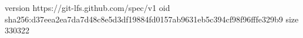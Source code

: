 version https://git-lfs.github.com/spec/v1
oid sha256:d37eea2ea7da7d48c8e5d3df19884fd0157ab9631eb5c394cf98f96fffe329b9
size 330322
